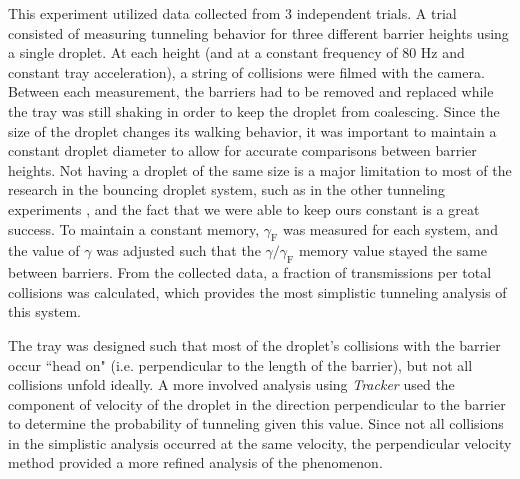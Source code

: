 This experiment utilized data collected from 3 independent trials. A trial consisted of measuring tunneling behavior for three different barrier heights using a single droplet. At each height (and at a constant frequency of 80 Hz and constant tray acceleration), a string of collisions were filmed with the camera. Between each measurement, the barriers had to be removed and replaced while the tray was still shaking in order to keep the droplet from coalescing. Since the size of the droplet changes its walking behavior, it was important to maintain a constant droplet diameter to allow for accurate comparisons between barrier heights. Not having a droplet of the same size is a major limitation to most of the research in the bouncing droplet system, such as in the other tunneling experiments \cite{tunneling}, and the fact that we were able to keep ours constant is a great success. To maintain a constant memory, $\gamma_\mathrm{F}$ was measured for each system, and the value of $\gamma$ was adjusted such that the $\gamma/\gamma_\mathrm{F}$ memory value stayed the same between barriers. From the collected data, a fraction of transmissions per total collisions was calculated, which provides the most simplistic tunneling analysis of this system. 

The tray was designed such that most of the droplet's collisions with the barrier occur ``head on" (i.e. perpendicular to the length of the barrier), but not all collisions unfold ideally. A more involved analysis using \textit{Tracker} used the component of velocity of the droplet in the direction perpendicular to the barrier to determine the probability of tunneling given this value. Since not all collisions in the simplistic analysis occurred at the same velocity, the perpendicular velocity method provided a more refined analysis of the phenomenon. 
